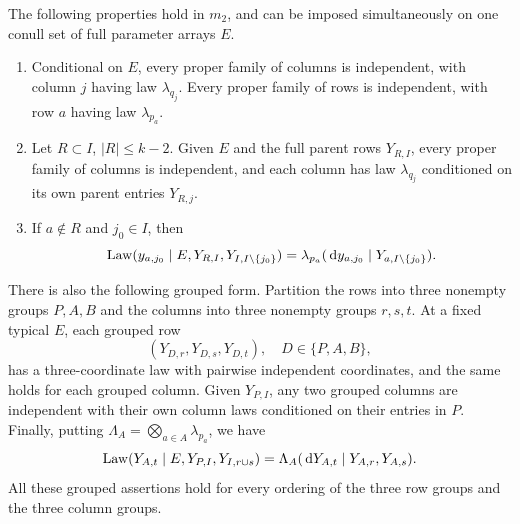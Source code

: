 \begin{proposition}\label{prop:square-locality}
The following properties hold in $m_2$, and can be imposed
simultaneously on one conull set of full parameter arrays $E$.
\begin{enumerate}
\item Conditional on $E$, every proper family of columns is independent,
with column $j$ having law $\lambda_{q_j}$.  Every proper family of rows
is independent, with row $a$ having law $\lambda_{p_a}$.
\item Let $R\subset I$, $|R|\leq k-2$.  Given $E$ and the full parent
rows $Y_{R,I}$, every proper family of columns is independent, and each
column has law $\lambda_{q_j}$ conditioned on its own parent entries
$Y_{R,j}$.
\item If $a\notin R$ and $j_0\in I$, then
\begin{equation}\label{eq:single-cell-locality}
 \operatorname{Law}(y_{a,j_0}\mid E,Y_{R,I},Y_{I,I\setminus\{j_0\}})
 =\lambda_{p_a}(\,\mathrm d y_{a,j_0}\mid Y_{a,I\setminus\{j_0\}}).
\end{equation}
\end{enumerate}
There is also the following grouped form.  Partition the rows into
three nonempty groups $P,A,B$ and the columns into three nonempty groups
$r,s,t$.  At a fixed typical $E$, each grouped row
\[
 (Y_{D,r},Y_{D,s},Y_{D,t}),\quad D\in\{P,A,B\},
\]
has a three-coordinate law with pairwise independent coordinates, and
the same holds for each grouped column.  Given $Y_{P,I}$, any two
grouped columns are independent with their own column laws conditioned
on their entries in $P$.  Finally, putting
$\Lambda_A=\bigotimes_{a\in A}\lambda_{p_a}$, we have
\begin{equation}\label{eq:grouped-cell-locality}
 \operatorname{Law}(Y_{A,t}\mid E,Y_{P,I},Y_{I,r\cup s})
 =\Lambda_A(\,\mathrm d Y_{A,t}\mid Y_{A,r},Y_{A,s}).
\end{equation}
All these grouped assertions hold for every ordering of the three row
groups and the three column groups.
\end{proposition}

